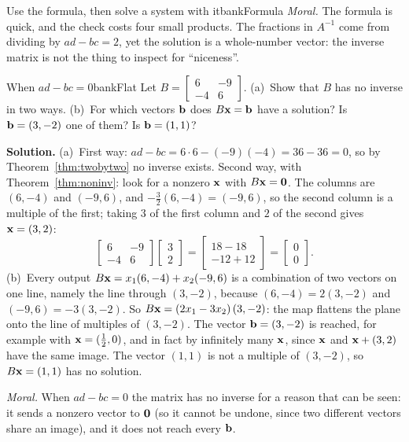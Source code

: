 \documentclass[11pt]{article}
\begin{document}
\begin{exmp}{Use the formula, then solve a system with it}{bankFormula}
\emph{Moral.} The formula is quick, and the check costs four small products. The fractions in $A^{-1}$ come from dividing by $ad-bc=2$, yet the solution is a whole-number vector: the inverse matrix is not the thing to inspect for ``niceness''.
\end{exmp}

\begin{exmp}{When $ad-bc=0$}{bankFlat}
Let $B=\begin{bmatrix}6&-9\\-4&6\end{bmatrix}$. (a)~Show that $B$ has no inverse in two ways. (b)~For which vectors $\mathbf{b}$ does $B\mathbf{x}=\mathbf{b}$ have a solution? Is $\mathbf{b}=(3,-2)$ one of them? Is $\mathbf{b}=(1,1)$?

\textbf{Solution.} (a)~First way: $ad-bc=6\cdot6-(-9)(-4)=36-36=0$, so by Theorem~\ref{thm:twobytwo} no inverse exists. Second way, with Theorem~\ref{thm:noninv}: look for a nonzero $\mathbf{x}$ with $B\mathbf{x}=\mathbf{0}$. The columns are $(6,-4)$ and $(-9,6)$, and $-\tfrac32(6,-4)=(-9,6)$, so the second column is a multiple of the first; taking $3$ of the first column and $2$ of the second gives $\mathbf{x}=(3,2)$:
\[
\begin{bmatrix}6&-9\\-4&6\end{bmatrix}\begin{bmatrix}3\\2\end{bmatrix}=\begin{bmatrix}18-18\\-12+12\end{bmatrix}=\begin{bmatrix}0\\0\end{bmatrix}.
\]
(b)~Every output $B\mathbf{x}=x_1(6,-4)+x_2(-9,6)$ is a combination of two vectors on one line, namely the line through $(3,-2)$, because $(6,-4)=2(3,-2)$ and $(-9,6)=-3(3,-2)$. So $B\mathbf{x}=(2x_1-3x_2)\,(3,-2)$: the map flattens the plane onto the line of multiples of $(3,-2)$. The vector $\mathbf{b}=(3,-2)$ is reached, for example with $\mathbf{x}=(\tfrac12,0)$, and in fact by infinitely many $\mathbf{x}$, since $\mathbf{x}$ and $\mathbf{x}+(3,2)$ have the same image. The vector $(1,1)$ is not a multiple of $(3,-2)$, so $B\mathbf{x}=(1,1)$ has no solution.

\emph{Moral.} When $ad-bc=0$ the matrix has no inverse for a reason that can be seen: it sends a nonzero vector to $\mathbf{0}$ (so it cannot be undone, since two different vectors share an image), and it does not reach every $\mathbf{b}$.
\end{exmp}
\end{document}
